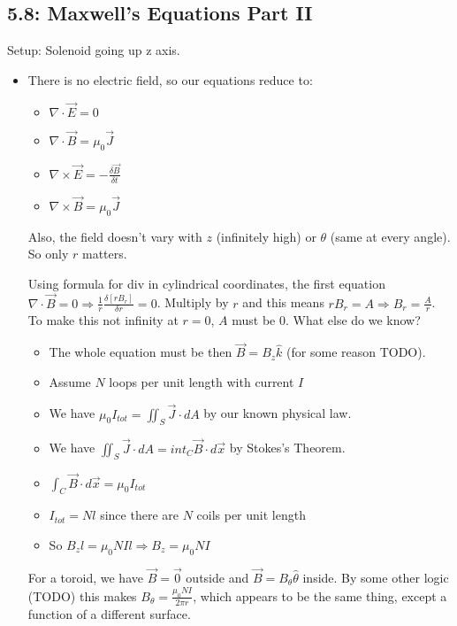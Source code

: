 \documentclass[11pt, oneside]{article}   	%
\begin{document}
\begin{itemize}
\end{itemize}

\subsection{5.8: Maxwell's Equations Part II}


Setup: Solenoid going up z axis.
\begin{itemize}
\item There is no electric field, so our equations reduce to:
\begin{itemize}
\item $\nabla \cdot \vec{E} = 0$
\item $\nabla \cdot \vec{B} = \mu_0\vec{J}$
\item $\nabla \times \vec{E} = -\frac{\delta \vec{B}}{\delta t}$
\item $\nabla \times \vec{B} = \mu_0\vec{J}$
\end{itemize}

Also, the field doesn't vary with $z$ (infinitely high) or $\theta$ (same at every angle). So only $r$ matters.

Using formula for div in cylindrical coordinates, the first equation $\nabla \cdot \vec{B} = 0 \Rightarrow \frac{1}{r} \frac{\delta [r B_r]}{\delta r} = 0$.  Multiply by $r$ and this means $rB_r = A \Rightarrow B_r = \frac{A}{r}$. To make this not infinity at $r=0$, $A$ must be 0.  What else do we know?

\begin{itemize}
\item The whole equation must be then $\vec{B} = B_z\hat{k}$ (for some reason TODO).
\item Assume $N$ loops per unit length with current $I$
\item We have $\mu_0I_{tot} = \iint_S \vec{J} \cdot dA$ by our known physical law.
\item We have $ \iint_S \vec{J} \cdot dA = int_C \vec{B} \cdot d\vec{x}$ by Stokes's Theorem.
\item $\int_C \vec{B} \cdot d\vec{x} = \mu_0I_{tot}$
\item $I_{tot} = Nl$ since there are $N$ coils per unit length
\item So $B_zl = \mu_0NIl \Rightarrow B_z = \mu_0NI$
\end{itemize}

For a toroid, we have $\vec{B} = \vec{0}$ outside and $\vec{B} = B_{\theta}\hat{\theta}$ inside.  By some other logic (TODO) this makes $B_{\theta} = \frac{\mu_0NI}{2\pi r}$, which appears to be the same thing, except a function of a different surface.

\end{itemize}
\end{document}
